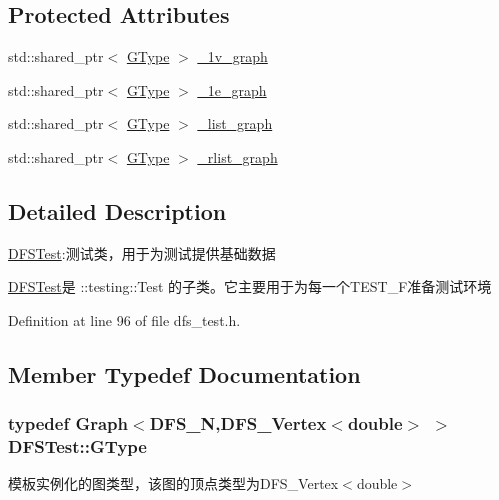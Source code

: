 \subsection*{Protected Attributes}
\begin{DoxyCompactItemize}
\item 
std\+::shared\+\_\+ptr$<$ \hyperlink{class_d_f_s_test_a32b63a9c79f6f7e7021daacf076a1512}{G\+Type} $>$ \hyperlink{class_d_f_s_test_a4dbae7784992bee522457b53da2141c2}{\+\_\+1v\+\_\+graph}
\item 
std\+::shared\+\_\+ptr$<$ \hyperlink{class_d_f_s_test_a32b63a9c79f6f7e7021daacf076a1512}{G\+Type} $>$ \hyperlink{class_d_f_s_test_ae5351e523345888ffc64aa892d93d3c2}{\+\_\+1e\+\_\+graph}
\item 
std\+::shared\+\_\+ptr$<$ \hyperlink{class_d_f_s_test_a32b63a9c79f6f7e7021daacf076a1512}{G\+Type} $>$ \hyperlink{class_d_f_s_test_a9607eac5350c4cdd449c353fed482efc}{\+\_\+list\+\_\+graph}
\item 
std\+::shared\+\_\+ptr$<$ \hyperlink{class_d_f_s_test_a32b63a9c79f6f7e7021daacf076a1512}{G\+Type} $>$ \hyperlink{class_d_f_s_test_a93a79d0654eb82517990c8f5419148a8}{\+\_\+rlist\+\_\+graph}
\end{DoxyCompactItemize}


\subsection{Detailed Description}
\hyperlink{class_d_f_s_test}{D\+F\+S\+Test}\+:测试类，用于为测试提供基础数据 

{\ttfamily \hyperlink{class_d_f_s_test}{D\+F\+S\+Test}}是 {\ttfamily \+::testing\+::\+Test} 的子类。它主要用于为每一个{\ttfamily T\+E\+S\+T\+\_\+\+F}准备测试环境 

Definition at line 96 of file dfs\+\_\+test.\+h.



\subsection{Member Typedef Documentation}
\hypertarget{class_d_f_s_test_a32b63a9c79f6f7e7021daacf076a1512}{}
\subsubsection[{G\+Type}]{\setlength{\rightskip}{0pt plus 5cm}typedef {\bf Graph}$<${\bf D\+F\+S\+\_\+\+N},{\bf D\+F\+S\+\_\+\+Vertex}$<$double$>$ $>$ {\bf D\+F\+S\+Test\+::\+G\+Type}}\label{class_d_f_s_test_a32b63a9c79f6f7e7021daacf076a1512}
模板实例化的图类型，该图的顶点类型为{\ttfamily D\+F\+S\+\_\+\+Vertex$<$double$>$} 

